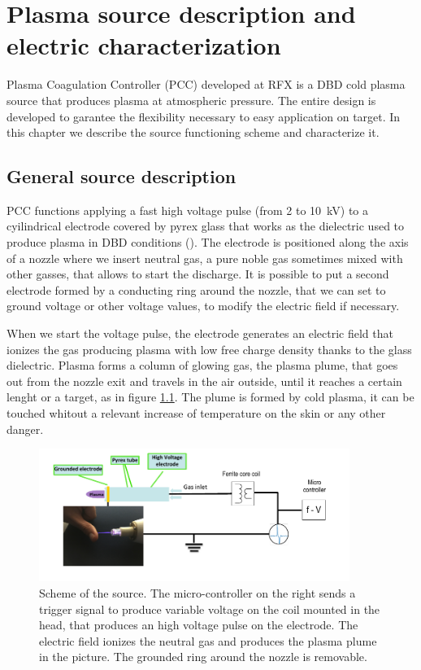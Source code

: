 \chapter{Plasma source description and electric characterization}
\label{ch:electric}
Plasma Coagulation Controller (PCC) developed at RFX is a DBD cold plasma source that produces plasma at atmospheric pressure. The entire design is developed to garantee the flexibility necessary to easy application on target. In this chapter we describe the source functioning scheme and characterize it.

\section{General source description}
PCC functions applying a fast high voltage pulse (from \num{2} to \SI{10}{\kilo\volt}) to a cyilindrical electrode covered by pyrex glass that works as the dielectric used to produce plasma in DBD conditions (\cite{DeMasi_2018}). The electrode is positioned along the axis of a nozzle where we insert neutral gas, a pure noble gas sometimes mixed with other gasses, that allows to start the discharge. It is possible to put a second electrode formed by a conducting ring around the nozzle, that we can set to ground voltage or other voltage values, to modify the electric field if necessary.

When we start the voltage pulse, the electrode generates an electric field that ionizes the gas producing plasma with low free charge density thanks to the glass dielectric. Plasma forms a column of glowing gas, the plasma plume, that goes out from the nozzle exit and travels in the air outside, until it reaches a certain lenght or a target, as in figure \ref{fig:source_scheme}. The plume is formed by cold plasma, it can be touched whitout a relevant increase of temperature on the skin or any other danger.

\begin{figure}
 \centering
 \includegraphics[width=0.9\textwidth]{Images/Electric/scheme.png}
 \caption{Scheme of the source. The micro-controller on the right sends a trigger signal to produce variable voltage on the coil mounted in the head, that produces an high voltage pulse on the electrode. The electric field ionizes the neutral gas and produces the plasma plume in the picture. The grounded ring around the nozzle is removable.}
 \label{fig:source_scheme}
\end{figure}

